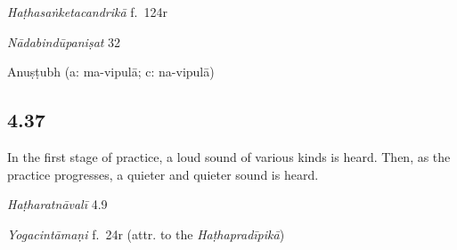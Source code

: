 \begin{ekdosis}
\begin{testimonia}[hp04_036]
\emph{Haṭhasaṅketacandrikā} f.~124r
\begin{versinnote}
\end{versinnote}

\emph{Nādabindūpaniṣat} 32
\begin{versinnote}
\end{versinnote}
\end{testimonia}


\begin{metre}[hp04_036]
Anuṣṭubh (a: ma-vipulā; c: na-vipulā)
\end{metre}

\subsection*{4.37}
\begin{translation}[hp04_037]
In the first stage of practice, a loud sound of various kinds is heard. Then, as the practice progresses, a quieter and quieter sound is heard.
\end{translation}


\begin{testimonia}[hp04_037]
\emph{Haṭharatnāvalī} 4.9
\begin{versinnote}
\end{versinnote}

\emph{Yogacintāmaṇi} f.~24r (attr. to the \emph{Haṭhapradīpikā})
\begin{versinnote}
\end{versinnote}


\end{testimonia}
\end{ekdosis}
